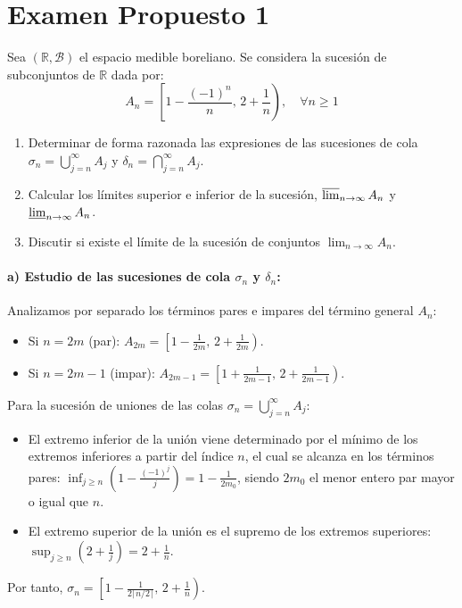 \section{Examen Propuesto 1}
\setcounter{problemacontador}{0}
\begin{problema}
Sea $(\mathbb{R}, \mathcal{B})$ el espacio medible boreliano. Se considera la sucesión de subconjuntos de $\mathbb{R}$ dada por:
\[
    A_n = \left[ 1 - \frac{(-1)^n}{n}, \, 2 + \frac{1}{n} \right), \quad \forall n \ge 1
\]
\begin{enumerate}[label=\alph*)]
    \item Determinar de forma razonada las expresiones de las sucesiones de cola $\sigma_n = \bigcup_{j=n}^\infty A_j$ y $\delta_n = \bigcap_{j=n}^\infty A_j$.
    \item Calcular los límites superior e inferior de la sucesión, $\varlimsup_{n \to \infty} A_n$ y $\varliminf_{n \to \infty} A_n$.
    \item Discutir si existe el límite de la sucesión de conjuntos $\lim_{n \to \infty} A_n$.
\end{enumerate}

\tcblower

\paragraph{a) Estudio de las sucesiones de cola $\sigma_n$ y $\delta_n$:}
Analizamos por separado los términos pares e impares del término general $A_n$:
\begin{itemize}
    \item Si $n = 2m$ (par): $A_{2m} = \left[ 1 - \frac{1}{2m}, \, 2 + \frac{1}{2m} \right)$.
    \item Si $n = 2m-1$ (impar): $A_{2m-1} = \left[ 1 + \frac{1}{2m-1}, \, 2 + \frac{1}{2m-1} \right)$.
\end{itemize}

Para la sucesión de uniones de las colas $\sigma_n = \bigcup_{j=n}^\infty A_j$:
\begin{itemize}
    \item El extremo inferior de la unión viene determinado por el mínimo de los extremos inferiores a partir del índice $n$, el cual se alcanza en los términos pares: $\inf_{j \ge n} \left( 1 - \frac{(-1)^j}{j} \right) = 1 - \frac{1}{2 m_0}$, siendo $2 m_0$ el menor entero par mayor o igual que $n$.
    \item El extremo superior de la unión es el supremo de los extremos superiores: $\sup_{j \ge n} \left( 2 + \frac{1}{j} \right) = 2 + \frac{1}{n}$.
\end{itemize}
Por tanto, $\sigma_n = \left[ 1 - \frac{1}{2 \lceil n/2 \rceil}, \, 2 + \frac{1}{n} \right)$.


\end{problema}
